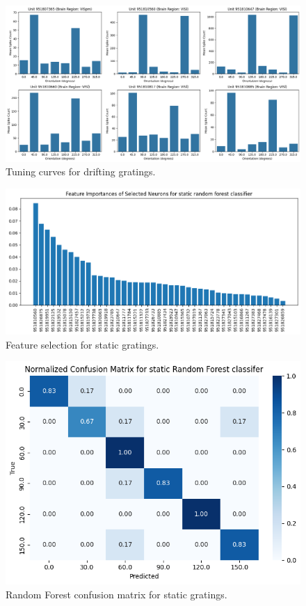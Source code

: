 \documentclass[10pt,twocolumn]{article}
\begin{document}
\begin{figure}[ht]
\centering
\includegraphics[width=\linewidth]{report_images/Drifting_tuning_curves.png}
\caption{Tuning curves for drifting gratings.}
\label{fig:drifting_tuning}
\end{figure}

\begin{figure}[ht]
\centering
\includegraphics[width=\linewidth]{report_images/static_feature_selection.png}
\caption{Feature selection for static gratings.}
\label{fig:static_feature}
\end{figure}

\begin{figure}[ht]
\centering
\includegraphics[width=\linewidth]{report_images/static_random_forest_confusion_matrix.png}
\caption{Random Forest confusion matrix for static gratings.}
\label{fig:static_rf_cm}
\end{figure}
\end{document}
